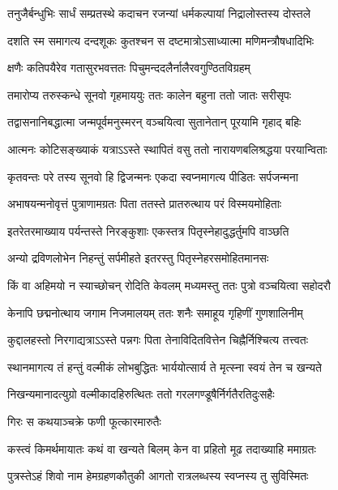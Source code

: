 \twolineshloka
{तनुजैर्बन्धुभिः सार्धं सम्प्रतस्थे कदाचन}
{रजन्यां धर्मकल्पायां निद्रालोस्तस्य दोस्तले} %

\twolineshloka
{दशति स्म समागत्य दन्दशूकः कुतश्चन}
{स दष्टमात्रोऽसाध्यात्मा मणिमन्त्रौषधादिभिः} %

\twolineshloka
{क्षणैः कतिपयैरेव गतासुरभवत्ततः}
{पिचुमन्ददलैर्नालैरवगुण्ठितविग्रहम्} %

\twolineshloka
{तमारोप्य तरुस्कन्धे सूनवो गृहमाययुः}
{ततः कालेन बहुना ततो जातः सरीसृपः} %

\twolineshloka
{तद्वासनानिबद्धात्मा जन्मपूर्वमनुस्मरन्}
{वञ्चयित्वा सुतानेतान् पूरयामि गृहाद् बहिः} %

\twolineshloka
{आत्मनः कोटिसङ्ख्याकं यत्राऽऽस्ते स्थापितं वसु}
{ततो नारायणबलिश्रद्धया परयान्विताः} %

\twolineshloka
{कृतवन्तः परे तस्य सूनवो हि द्विजन्मनः}
{एकदा स्वप्नमागत्य पीडितः सर्पजन्मना} %

\twolineshloka
{अभाषयन्मनोवृत्तं पुत्राणामग्रतः पिता}
{ततस्ते प्रातरुत्थाय परं विस्मयमोहिताः} %

\twolineshloka
{इतरेतरमाख्याय पर्यन्तस्ते निरङ्कुशाः}
{एकस्तत्र पितृस्नेहादुद्धर्तुमपि वाञ्छति} %

\twolineshloka
{अन्यो द्रविणलोभेन निहन्तुं सर्पमीहते}
{इतरस्तु पितृस्नेहरसमोहितमानसः} %

\twolineshloka
{किं वा अहिमयो न स्याच्छोचन् रोदिति केवलम्}
{मध्यमस्तु ततः पुत्रो वञ्चयित्वा सहोदरौ} %

\twolineshloka
{केनापि छद्मनोत्थाय जगाम निजमालयम्}
{ततः शनैः समाहूय गृहिणीं गुणशालिनीम्} %

\twolineshloka
{कुद्दालहस्तो निरगाद्यत्राऽऽस्ते पन्नगः पिता}
{तेनाविदितवित्तेन चिह्नैर्निश्चित्य तत्त्वतः} %

\twolineshloka
{स्थानमागत्य तं हन्तुं वल्मीकं लोभबुद्धितः}
{भार्ययोत्सार्य ते मृत्स्ना स्वयं तेन च खन्यते} %

\twolineshloka
{निखन्यमानादत्युग्रो वल्मीकादहिरुत्थितः}
{ततो गरलगण्डूषैर्निर्गतैरतिदुःसहैः} %

\onelineshloka
{गिरः स कथयाञ्चक्रे फणी फूत्कारमारुतैः} %


\twolineshloka
{कस्त्वं किमर्थमायातः कथं वा खन्यते बिलम्}
{केन वा प्रहितो मूढ तदाख्याहि ममाग्रतः} %


\twolineshloka
{पुत्रस्तेऽहं शिवो नाम हेमग्रहणकौतुकी}
{आगतो रात्रलब्धस्य स्वप्नस्य तु सुविस्मितः} %

